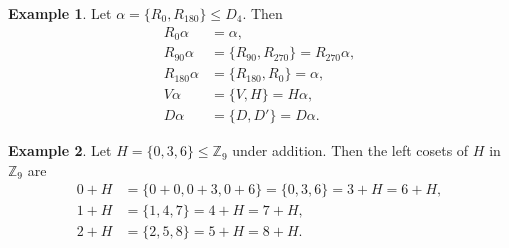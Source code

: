 \documentclass{article}
\newtheorem{lemma}{Lemma}[section]
\theoremstyle{definition}
\newtheorem{example}{Example}[section]
\begin{document}
     \begin{example}
         Let $\alpha=\{R_0,R_{180}\} \leq D_4$. Then
         \begin{align*}
             R_0\alpha &= \alpha, \\
             R_{90}\alpha &= \{R_{90},R_{270}\} = R_{270}\alpha, \\
             R_{180}\alpha &= \{R_{180},R_0\} = \alpha, \\
             V\alpha &= \{V,H\} = H\alpha, \\
             D\alpha &= \{D,D'\} = D\alpha.
         \end{align*}
     \end{example}
     
     \begin{example}
         Let $H = \{0,3,6\} \leq \mathbb{Z}_9$ under addition. Then the left cosets of $H$ in $\mathbb{Z}_9$ are
         \begin{align*}
             0+H &= \{0+0,0+3,0+6\} = \{0,3,6\} = 3+H = 6+H, \\
             1+H &= \{1,4,7\} = 4+H = 7+H, \\
             2+H &= \{2,5,8\} = 5+H = 8+H.
         \end{align*}
     \end{example}
     
     \noindent{}
     
\end{document}
